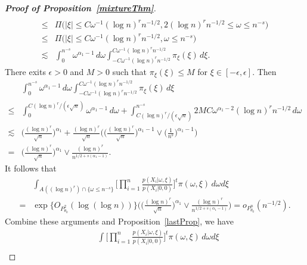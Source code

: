 \documentclass[11pt]{article}
\theoremstyle{plain}
\theoremstyle{definition}
\theoremstyle{remark}
\begin{document}
\begin{appendices}
\begin{proof}[\textbf{Proof of Proposition~\ref{mixtureThm}}]
\begin{align*}
    \\
    \leq
    &\Pi\big(|\xi|\leq C \omega^{-1} (\log n)^r n^{-1/2},   2(\log n)^r n^{-1/2} \leq \omega\leq n^{-s}\big)
    \\
    \leq
    &\Pi\big(|\xi|\leq C \omega^{-1} (\log n)^r n^{-1/2},\omega\leq n^{-s}\big)
    \\
    \lesssim &
    \int_{0}^{n^{-s}} \omega^{\alpha_1-1}\, d\omega
    \int_{-C \omega^{-1} (\log n)^r n^{-1/2}}^{C \omega^{-1} (\log n)^r n^{-1/2}} \pi_{\xi}(\xi) \, d\xi.
\end{align*}
There exits $\epsilon>0$ and $M>0$ such that $\pi_{\xi}(\xi)\leq M$ for $\xi\in [-\epsilon,\epsilon]$. Then
\begin{align*}
    &\int_{0}^{n^{-s}} \omega^{\alpha_1-1}\, d\omega
    \int_{-C \omega^{-1} (\log n)^r n^{-1/2}}^{C \omega^{-1} (\log n)^r n^{-1/2}} \pi_{\xi}(\xi) \, d\xi
    \\
    \leq &
    \int_{0}^{{C(\log n)^r}/{(\epsilon \sqrt{n})}} \omega^{\alpha_1-1}\, d\omega
    +
    \int_{{C(\log n)^r}/{(\epsilon \sqrt{n})}}^{n^{-s}} 
    2MC \omega^{\alpha_1-2}(\log n)^r n^{-1/2}
    \, d\omega
    \\
    \lesssim &
     \Big(\frac{(\log n)^r}{\sqrt{n}}\Big)^{\alpha_1}
     +\frac{(\log n)^r}{\sqrt{n}}\Bigg(\Big(\frac{(\log n)^r}{\sqrt{n}}\Big)^{\alpha_1-1}\vee \Big(\frac{1}{n^{s}}\Big)^{\alpha_1-1}\Bigg)
     \\
    = &
    \Big(\frac{(\log n)^r}{\sqrt{n}}\Big)^{\alpha_1}\vee \frac{(\log n)^r}{n^{1/2+s(\alpha_1-1)}}.
\end{align*}
It follows that
\begin{align*}
    & \int_{A( (\log n)^r )\cap \{\omega\leq n^{-s}\}} \Big[\prod_{i=1}^n \frac{p(X_i|\omega,\xi)}{p(X_i|0,0)}\Big]^t \pi(\omega,\xi)\, d\omega d\xi
    \\
    =&\exp\big\{O_{P^2_{\theta_0}}(\log(\log n))\big\}
    \Bigg(\Big(\frac{(\log n)^r}{\sqrt{n}}\Big)^{\alpha_1}\vee \frac{(\log n)^r}{n^{1/2+s(\alpha_1-1)}}\Bigg)=o_{P^n_{\theta_0}}(n^{-1/2}).
\end{align*}
Combine these arguments and Proposition~\ref{lastProp}, we have
\begin{align*}
    & \int \Big[\prod_{i=1}^n \frac{p(X_i|\omega,\xi)}{p(X_i|0,0)}\Big]^t \pi(\omega,\xi)\, d\omega d\xi
    \\

\end{align*}
\end{proof}
\end{appendices}
\end{document}
